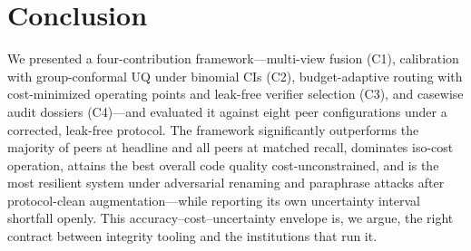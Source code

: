 \documentclass[conference]{IEEEtran}
\begin{document}
\section{Conclusion}
\label{sec:conclusion}
We presented a four-contribution framework---multi-view fusion (C1), calibration with
group-conformal UQ under binomial CIs (C2), budget-adaptive routing with cost-minimized operating
points and leak-free verifier selection (C3), and casewise audit dossiers (C4)---and evaluated it
against eight peer configurations under a corrected, leak-free protocol. The framework
significantly outperforms the majority of peers at headline and all peers at matched recall,
dominates iso-cost operation, attains the best overall code quality cost-unconstrained, and is the
most resilient system under adversarial renaming and paraphrase attacks after protocol-clean
augmentation---while reporting its own uncertainty interval shortfall openly. This
accuracy--cost--uncertainty envelope is, we argue, the right contract between integrity tooling
and the institutions that run it.
\end{document}
